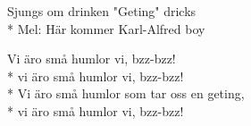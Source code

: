 \begin{SongText}[Humlorna]
    \begin{SongInfo}
        Sjungs om drinken "Geting" dricks\\*%
        Mel: Här kommer Karl-Alfred boy
    \end{SongInfo}
    \begin{SongVerse}
        Vi äro små humlor vi, bzz-bzz!\\*%
        vi äro små humlor vi, bzz-bzz!\\*%
        Vi äro små humlor som tar oss en geting,\\*%
        vi äro små humlor vi, bzz-bzz!
    \end{SongVerse}
\end{SongText}
